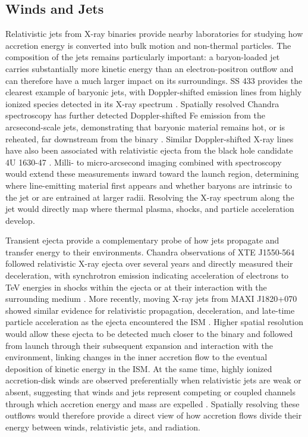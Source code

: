 \documentclass{article}
\begin{document}
\subsection{Winds and Jets} 

\label{sec:wind_jet}

Relativistic jets from X-ray binaries provide nearby laboratories for studying how accretion energy is converted into bulk motion and non-thermal particles. The composition of the jets remains particularly important: a baryon-loaded jet carries substantially more kinetic energy than an electron-positron outflow and can therefore have a much larger impact on its surroundings. SS 433 provides the clearest example of baryonic jets, with Doppler-shifted emission lines from highly ionized species detected in its X-ray spectrum \cite{2002ApJ...564..941M}. Spatially resolved Chandra spectroscopy has further detected Doppler-shifted Fe emission from the arcsecond-scale jets, demonstrating that baryonic material remains hot, or is reheated, far downstream from the binary \cite{2002Sci...297.1673M}. Similar Doppler-shifted X-ray lines have also been associated with relativistic ejecta from the black hole candidate 4U 1630-47 \cite{2013Natur.504..260D}. Milli- to micro-arcsecond imaging combined with spectroscopy would extend these measurements inward toward the launch region, determining where line-emitting material first appears and whether baryons are intrinsic to the jet or are entrained at larger radii. Resolving the X-ray spectrum along the jet would directly map where thermal plasma, shocks, and particle acceleration develop.

Transient ejecta provide a complementary probe of how jets propagate and transfer energy to their environments. Chandra observations of XTE J1550-564 followed relativistic X-ray ejecta over several years and directly measured their deceleration, with synchrotron emission indicating acceleration of electrons to TeV energies in shocks within the ejecta or at their interaction with the surrounding medium \cite{2002Sci...298..196C}. More recently, moving X-ray jets from MAXI J1820+070 showed similar evidence for relativistic propagation, deceleration, and late-time particle acceleration as the ejecta encountered the ISM \cite{2020ApJ...895L..31E}. Higher spatial resolution would allow these ejecta to be detected much closer to the binary and followed from launch through their subsequent expansion and interaction with the environment, linking changes in the inner accretion flow to the eventual deposition of kinetic energy in the ISM. At the same time, highly ionized accretion-disk winds are observed preferentially when relativistic jets are weak or absent, suggesting that winds and jets represent competing or coupled channels through which accretion energy and mass are expelled \cite{2009Natur.458..481N,2012MNRAS.422L..11P}. Spatially resolving these outflows would therefore provide a direct view of how accretion flows divide their energy between winds, relativistic jets, and radiation.
\end{document}
